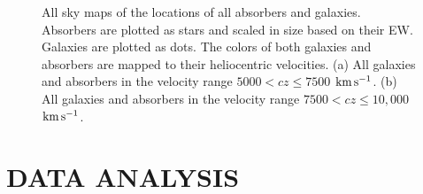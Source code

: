 \documentclass[twocolumn,tighten]{aastex62}
\newcommand{\kms}{$\rm km\, s^{-1}$}
\begin{document}
\begin{figure}[ht!]
\vspace{-5pt}
\centering
  \label{allsky_7500}
  \label{allsky_10000}
  \caption{\small{All sky maps of the locations of all absorbers and galaxies. Absorbers are plotted as stars and scaled in size based on their EW. Galaxies are plotted as dots. The colors of both galaxies and absorbers are mapped to their heliocentric velocities. (a) All galaxies and absorbers in the velocity range $5000 < cz \leq 7500$ \kms. (b) All galaxies and absorbers in the velocity range $7500 < cz \leq 10,000$ \kms.}}
\label{allsky_7500-10000}
\vspace{1pt}
\end{figure}

\section{DATA ANALYSIS}
\end{document}
